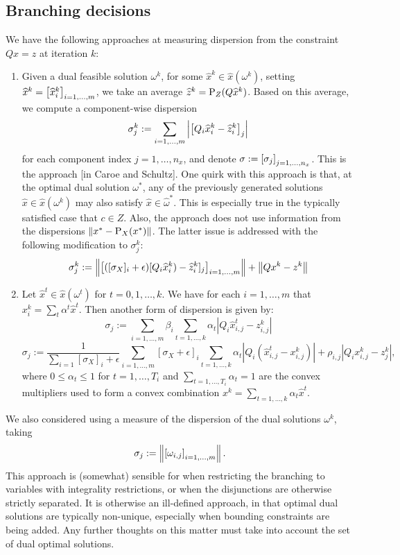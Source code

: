 \subsection{Branching decisions}
We have the following approaches at measuring dispersion from the constraint $Qx=z$ at iteration $k$:
\begin{enumerate}
\item Given a dual feasible solution $\omega^k$, for some $\widehat{x}^k \in \widehat{x}(\omega^k)$, 
setting $\widehat{x}^k=\left[ \widehat{x}_i^k \right]_{i=1,\dots,m}$, we take an average $\widehat{z}^k = \text{P}_Z(Q\widehat{x}^k)$. Based on this average,
we compute a component-wise dispersion 
$$\sigma_j^k:=\sum_{i=1,\dots,m} \left| \left[ Q_i\widehat{x}_i^k - \widehat{z}_i^k \right]_j \right|$$%
for each component index $j=1,\dots,n_x$, and denote $\sigma:=\left[ \sigma_j \right]_{j=1,\dots,n_x}$. This is the approach [in Caroe and Schultz]. One quirk with this approach is that, at the optimal dual solution $\omega^*$, any of the previously generated solutions $\widehat{x} \in \widehat{x}(\omega^k)$ may also satisfy $\widehat{x} \in \widehat{\omega}^*$. This is especially true in the typically satisfied case that $c \in Z$. Also, the approach does not use information from the dispersions $\left \| x^* - \text{P}_X(x^*) \right \|$. The latter issue is addressed with the following modification to $\sigma_j^k$:
$$
\sigma_j^k:=\left \|  \left[([\sigma_X]_i+\epsilon)[Q_i\widehat{x}_{i}^k) - \widehat{z}_i^k]_j\right]_{i=1,\dots,m}  \right \| + \left \| Qx^k-z^k \right \|
$$
\item Let $\widehat{x}^t \in \widehat{x}(\omega^t)$ for $t=0,1,\dots,k$. We have for each $i=1,\dots,m$ that $x_i^k = \sum_{t} \alpha^t \widehat{x}^t$. Then another form of dispersion is given by:
$$
\sigma_j := \sum_{i=1,\dots,m} \beta_i \sum_{t=1,\dots,k} \alpha_t \left|Q_i \widehat{x}_{i,j}^t - z_{i,j}^k \right| $$
$$ \sigma_j := \frac{1}{\sum_{i=1} [\sigma_X]_i+\epsilon}\sum_{i=1,\dots,m} [\sigma_X+\epsilon]_i \sum_{t=1,\dots,k} \alpha_t \left|Q_i\left( \widehat{x}_{i,j}^t - x_{i,j}^k \right) \right| + \rho_{i,j}\left| Q_i x_{i,j}^k - z_j^k \right|, $$
where $0 \le \alpha_t \le 1$ for $t=1,\dots,T_i$ and $\sum_{t=1,\dots,T_i} \alpha_t = 1$ are the convex multipliers used to form a convex combination $x^k = \sum_{t=1,\dots,k} \alpha_t\widehat{x}^t$.
\end{enumerate}

\begin{remark}
We also considered using a measure of the dispersion of the dual solutions $\omega^k$, taking
$$
\sigma_j := \left \| \left[\omega_{i,j}\right]_{i=1,\dots,m} \right \|.
$$
This approach is (somewhat) sensible for when restricting the branching to variables with integrality restrictions, or when the disjunctions are otherwise strictly separated. It is otherwise an ill-defined approach, in that optimal dual solutions are typically non-unique, especially when bounding constraints are being added. Any further thoughts on this matter must take into account the set of dual optimal solutions.
\end{remark}

